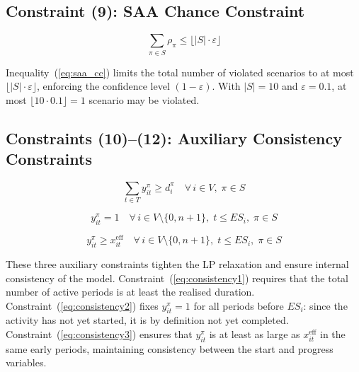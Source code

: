 \subsection*{Constraint (9): SAA Chance Constraint}

\begin{equation}
    \sum_{\pi \in S} \rho_{\pi}
    \leq \lfloor |S| \cdot \varepsilon \rfloor
    \tag{9}
    \label{eq:saa_cc}
\end{equation}

Inequality~(\ref{eq:saa_cc}) limits the total number of violated
scenarios to at most $\lfloor |S| \cdot \varepsilon \rfloor$,
enforcing the confidence level $(1 - \varepsilon)$. With
$|S| = 10$ and $\varepsilon = 0.1$, at most
$\lfloor 10 \cdot 0.1 \rfloor = 1$ scenario may be violated.

\subsection*{Constraints (10)--(12): Auxiliary Consistency
Constraints}

\begin{equation}
    \sum_{t \in T} y_{it}^{\pi}
    \geq d_i^{\pi}
    \quad \forall\, i \in V,\;
    \pi \in S
    \tag{10}
    \label{eq:consistency1}
\end{equation}

\begin{equation}
    y_{it}^{\pi} = 1
    \quad \forall\, i \in V \setminus \{0, n{+}1\},\;
    t \leq ES_i,\;
    \pi \in S
    \tag{11}
    \label{eq:consistency2}
\end{equation}

\begin{equation}
    y_{it}^{\pi} \geq x^{\mathrm{eff}}_{it}
    \quad \forall\, i \in V \setminus \{0, n{+}1\},\;
    t \leq ES_i,\;
    \pi \in S
    \tag{12}
    \label{eq:consistency3}
\end{equation}

These three auxiliary constraints tighten the LP relaxation and
ensure internal consistency of the model.
Constraint~(\ref{eq:consistency1}) requires that the total number
of active periods is at least the realised duration.
Constraint~(\ref{eq:consistency2}) fixes $y_{it}^{\pi} = 1$ for
all periods before $ES_i$: since the activity has not yet started,
it is by definition not yet completed.
Constraint~(\ref{eq:consistency3}) ensures that $y_{it}^{\pi}$ is
at least as large as $x^{\mathrm{eff}}_{it}$ in the same early
periods, maintaining consistency between the start and progress
variables.

